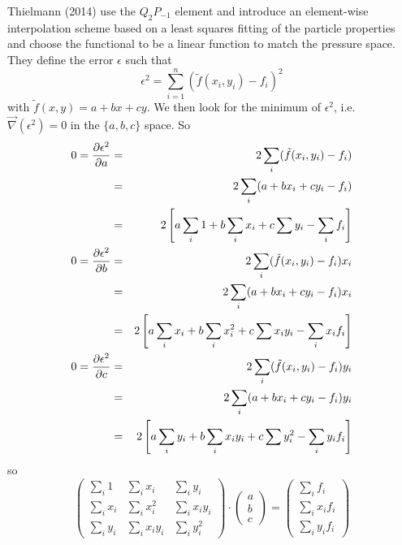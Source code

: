 Thielmann \etal (2014) \cite{thmk14} use the $Q_2P_{-1}$ element and introduce an element-wise interpolation
scheme based on a least squares fitting of the particle properties and choose the functional to 
be a linear function to match the pressure space. 
They define the error $\epsilon$ such that 
\[
\epsilon^2 = \sum_{i=1}^n ( \tilde{f}(x_i,y_i)-f_i)^2
\]
with $\tilde{f}(x,y)=a+bx+cy$. 
We then look for the minimum of $\epsilon^2$, i.e. $\vec\nabla(\epsilon^2)=0$ in the $\{a,b,c\}$ space.
So 
\begin{eqnarray}
0=\frac{\partial \epsilon^2}{\partial a} 
&=& 2\sum\limits_i ( \tilde{f}(x_i,y_i)-f_i) \nonumber\\
&=& 2\sum\limits_i ( a + bx_i +cy_i -f_i) \nonumber\\
&=& 2 \left[ a \sum\limits_i 1 + b \sum\limits_i x_i + c \sum y_i - \sum\limits_i f_i \right] \nonumber\\
0=\frac{\partial \epsilon^2}{\partial b} &=& 2\sum\limits_i ( \tilde{f}(x_i,y_i)-f_i) x_i \nonumber\\
&=& 2\sum\limits_i ( a + bx_i +cy_i -f_i) x_i \nonumber\\
&=& 2 \left[ a \sum\limits_i x_i  + b \sum\limits_i x_i^2 + c \sum x_i y_i - \sum\limits_i x_i f_i \right]\nonumber\\
0=\frac{\partial \epsilon^2}{\partial c} &=& 2\sum\limits_i ( \tilde{f}(x_i,y_i)-f_i) y_i \nonumber\\ 
&=& 2\sum\limits_i ( a + bx_i +cy_i -f_i) y_i \nonumber\\
&=& 2 \left[ a \sum\limits_i y_i + b \sum\limits_i x_i y_i + c \sum y_i^2 - \sum\limits_i y_if_i \right] \nonumber
\end{eqnarray}
so 
\[
\left( 
\begin{array}{ccc}
\sum\limits_i 1 & \sum\limits_i x_i & \sum\limits_i y_i \\
\sum\limits_i x_i & \sum\limits_i x_i^2 & \sum\limits_i x_iy_i \\
\sum\limits_i y_i & \sum\limits_i x_i y_i & \sum\limits_i y_i^2 
\end{array}
\right)
\cdot
\left(
\begin{array}{c}
a\\
b\\
c
\end{array}
\right)
=
\left(
\begin{array}{c}
\sum\limits_i f_i \\
\sum\limits_i x_i f_i \\
\sum\limits_i y_i f_i 
\end{array}
\right)
\]


